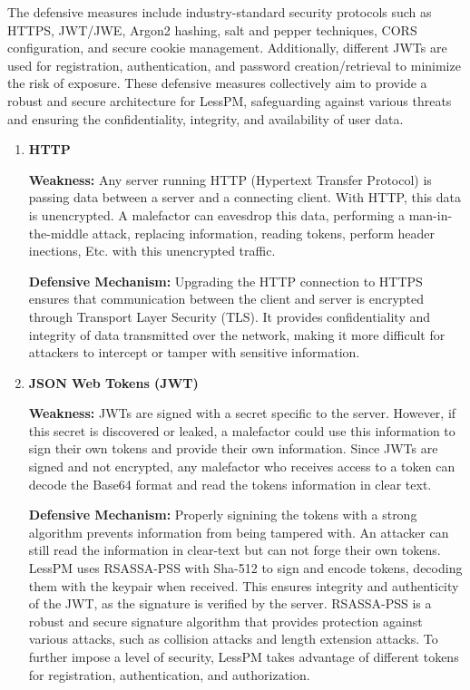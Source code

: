 The defensive measures include industry-standard security protocols such as
  HTTPS, JWT/JWE, Argon2 hashing, salt and pepper techniques, CORS
  configuration, and secure cookie management.
Additionally, different JWTs are used for registration, authentication, and
  password creation/retrieval to minimize the risk of exposure.
These defensive measures collectively aim to provide a robust and secure
  architecture for LessPM, safeguarding against various threats and ensuring
  the confidentiality, integrity, and availability of user data.
\begin{enumerate}[label=$\blacktriangleright$]
  \item \textbf{HTTP}

  \textbf{Weakness:}
  Any server running HTTP (Hypertext Transfer Protocol) is passing data
  between a server and a connecting client.
  With HTTP, this data is unencrypted.
  A malefactor can eavesdrop this data, performing a man-in-the-middle attack,
  replacing information, reading tokens, perform header inections, Etc. with 
  this unencrypted traffic.

  \textbf{Defensive Mechanism:}
  Upgrading the HTTP connection to HTTPS ensures that communication between the
  client and server is encrypted through Transport Layer Security (TLS).
  It provides confidentiality and integrity of data transmitted over the
  network, making it more difficult for attackers to intercept or tamper with
  sensitive information.

  \item \textbf{JSON Web Tokens (JWT)}

  \textbf{Weakness:}
  JWTs are signed with a secret specific to the server.
  However, if this secret is discovered or leaked, a malefactor could use this
  information to sign their own tokens and provide their own information.
  Since JWTs are signed and not encrypted, any malefactor who receives access
  to a token can decode the Base64 format and read the tokens information in
  clear text.

  \textbf{Defensive Mechanism:}
  Properly signining the tokens with a strong algorithm prevents information
  from being tampered with.
  An attacker can still read the information in clear-text but can not forge
  their own tokens.
  LessPM uses RSASSA-PSS with Sha-512 to sign and encode tokens, decoding
  them with the keypair when received.
  This ensures integrity and authenticity of the JWT, as the signature is
  verified by the server.
  RSASSA-PSS is a robust and secure signature algorithm that provides protection
  against various attacks, such as collision attacks and length extension
  attacks.
  To further impose a level of security, LessPM takes advantage of different
  tokens for registration, authentication, and authorization.


\end{enumerate}
